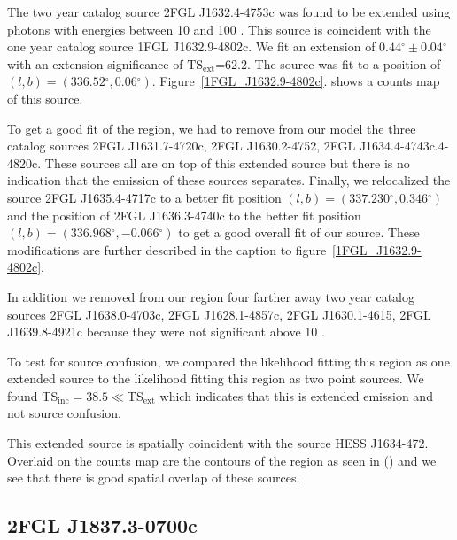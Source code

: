 \documentclass[12pt,preprint]{aastex}
\newcommand{\gev}{\text{GeV}\xspace}
\newcommand{\tev}{\text{TeV}\xspace}
\newcommand{\tsext}{{\ensuremath{\text{TS}_\text{ext}}}\xspace}
\newcommand{\tsinc}{\ensuremath{\text{TS}_\text{inc}}\xspace}
\renewcommand{\deg}{\ensuremath{^\circ}\xspace}
\begin{document}
The two year catalog source 2FGL J1632.4-4753c was found to be extended
using photons with energies between 10 \gev and 100 \gev.  This source
is coincident with the one year catalog source 1FGL J1632.9-4802c.
We fit an extension of $0.44\deg\pm0.04\deg$ with an extension
significance of \tsext=62.2.  The source was fit to a position
of $(l,b)=(336.52\deg,0.06\deg)$.  Figure~\ref{1FGL_J1632.9-4802c}.
shows a counts map of this source. 

To get a good fit of the region, we had to remove from our model
the three catalog sources 2FGL J1631.7-4720c, 2FGL J1630.2-4752,
2FGL J1634.4-4743c.4-4820c. These sources all are on top of this
extended source but there is no indication that the emission of these
sources separates.  Finally, we relocalized the
source 2FGL J1635.4-4717c to a better fit position $(l,b)=(337.230\deg,0.346\deg)$
and the position of 2FGL J1636.3-4740c to the better fit position
$(l,b)=(336.968\deg,-0.066\deg)$ to get a good overall fit of our source.
These modifications are further described in the caption to 
figure~\ref{1FGL_J1632.9-4802c}.

In addition we removed from our region four farther away two year
catalog sources 2FGL J1638.0-4703c, 2FGL J1628.1-4857c, 2FGL  J1630.1-4615,
2FGL J1639.8-4921c because they were not significant above 10 \gev.

To test for source confusion, we compared the likelihood fitting this
region as one extended source to the likelihood fitting this region as
two point sources. We found $\tsinc=38.5\ll\tsext$ which indicates that
this is extended emission and not source confusion.

This extended source is spatially coincident with
the \tev source HESS J1634-472.  Overlaid on the counts map are the
contours of the region as seen in \tev (\cite{HESS_plane_survey})
and we see that there is good spatial overlap of these sources.


\subsection{2FGL J1837.3-0700c}
\label{section_2FGL_J1837.3-0700c}


\end{document}
